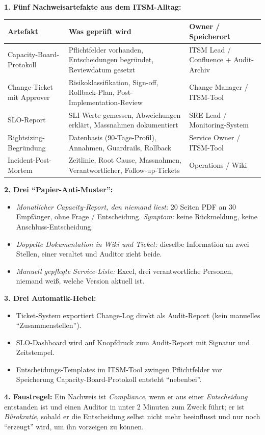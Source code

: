 \documentclass[11pt,a4paper,oneside]{article}
\begin{document}
\begin{loesungbox}
\textbf{1. F\"unf Nachweisartefakte aus dem ITSM-Alltag:}

\smallskip
\begin{tabularx}{\linewidth}{@{}p{4.0cm}XX@{}}
\toprule
\textbf{Artefakt} & \textbf{Was gepr\"uft wird} & \textbf{Owner / Speicherort} \\
\midrule
Capacity-Board-Protokoll & Pflichtfelder vorhanden, Entscheidungen begr\"undet, Reviewdatum gesetzt & ITSM Lead / Confluence + Audit-Archiv \\
Change-Ticket mit Approver & Risikoklassifikation, Sign-off, Rollback-Plan, Post-Implementation-Review & Change Manager / ITSM-Tool \\
SLO-Report                 & SLI-Werte gemessen, Abweichungen erkl\"art, Massnahmen dokumentiert & SRE Lead / Monitoring-System \\
Rightsizing-Begr\"undung   & Datenbasis (90-Tage-Profil), Annahmen, Guardrails, Rollback & Service Owner / ITSM-Tool \\
Incident-Post-Mortem       & Zeitlinie, Root Cause, Massnahmen, Verantwortlicher, Follow-up-Tickets & Operations / Wiki \\
\bottomrule
\end{tabularx}

\smallskip
\textbf{2. Drei ``Papier-Anti-Muster'':}
\begin{itemize}
  \item \emph{Monatlicher Capacity-Report, den niemand liest:} 20 Seiten PDF an 30 Empf\"anger, ohne Frage / Entscheidung. \emph{Symptom:} keine R\"uckmeldung, keine Anschluss-Entscheidung.
  \item \emph{Doppelte Dokumentation in Wiki und Ticket:} dieselbe Information an zwei Stellen, einer veraltet \textendash{} und Auditor zieht beide.
  \item \emph{Manuell gepflegte Service-Liste:} Excel, drei verantwortliche Personen, niemand wei{\ss}, welche Version aktuell ist.
\end{itemize}

\smallskip
\textbf{3. Drei Automatik-Hebel:}
\begin{itemize}
  \item Ticket-System exportiert Change-Log direkt als Audit-Report (kein manuelles ``Zusammenstellen'').
  \item SLO-Dashboard wird auf Knopfdruck zum Audit-Report \textendash{} mit Signatur und Zeitstempel.
  \item Entscheidungs-Templates im ITSM-Tool zwingen Pflichtfelder vor Speicherung \textendash{} Capacity-Board-Protokoll entsteht ``nebenbei''.
\end{itemize}

\smallskip
\textbf{4. Faustregel:} Ein Nachweis ist \emph{Compliance}, wenn er aus einer \emph{Entscheidung} entstanden ist und einen Auditor in unter 2 Minuten zum Zweck f\"uhrt; er ist \emph{B\"urokratie}, sobald er die Entscheidung selbst nicht mehr beeinflusst und nur noch ``erzeugt'' wird, um ihn vorzeigen zu k\"onnen.
\end{loesungbox}
\end{document}
